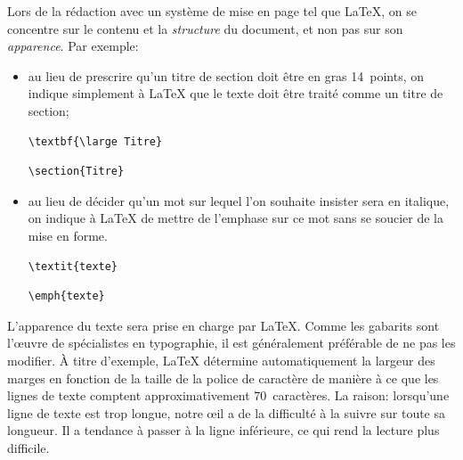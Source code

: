 Lors de la rédaction avec un système de mise en page tel que {\LaTeX},
on se concentre sur le contenu et la \emph{structure} du document, et
non pas sur son \emph{apparence}. Par exemple:
\begin{itemize}
\item au lieu de prescrire qu'un titre de section doit être en gras
  14~points, on indique simplement à {\LaTeX} que le texte doit être
  traité comme un titre de section;
  \begin{demo}
    \begin{minipage}{0.45\linewidth}
\begin{lstlisting}
\textbf{\large Titre}
\end{lstlisting}
    \end{minipage}
    \hfill \faArrowRight \hfill
    \begin{minipage}{0.45\linewidth}
\begin{lstlisting}
\section{Titre}
\end{lstlisting}
    \end{minipage}
  \end{demo}
\item au lieu de décider qu'un mot sur lequel l'on souhaite insister
  sera en italique, on indique à {\LaTeX} de mettre de l'emphase sur
  ce mot sans se soucier de la mise en forme.
  \begin{demo}
    \begin{minipage}{0.45\linewidth}
\begin{lstlisting}
\textit{texte}
\end{lstlisting}
    \end{minipage}
    \hfill \faArrowRight \hfill
    \begin{minipage}{0.45\linewidth}
\begin{lstlisting}
\emph{texte}
\end{lstlisting}
    \end{minipage}
  \end{demo}
\end{itemize}

L'apparence du texte sera prise en charge par {\LaTeX}. Comme les
gabarits sont l'{\oe}uvre de spécialistes en typographie, il est
généralement préférable de ne pas les modifier. À titre d'exemple,
{\LaTeX} détermine automatiquement la largeur des marges en fonction
de la taille de la police de caractère de manière à ce que les lignes
de texte comptent approximativement 70~caractères. La raison:
lorsqu'une ligne de texte est trop longue, notre {\oe}il a de la
difficulté à la suivre sur toute sa longueur. Il a tendance à passer à
la ligne inférieure, ce qui rend la lecture plus difficile.


